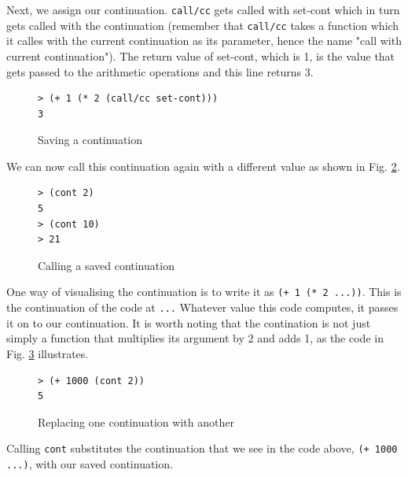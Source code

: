 \documentclass[11pt]{report}
\begin{document}
Next, we assign our continuation. \texttt{call/cc} gets called with set-cont which in turn gets called with the continuation (remember that \texttt{call/cc} takes a function which it calles with the current continuation as its parameter, hence the name "call with current continuation"). The return value of set-cont, which is 1, is the value that gets passed to the arithmetic operations and this line returns 3.
\begin{figure}[ht]
\begin{lstlisting}
> (+ 1 (* 2 (call/cc set-cont)))
3
\end{lstlisting}
\caption{Saving a continuation}
\label{contcc2}
\end{figure}

We can now call this continuation again with a different value as shown in Fig. \ref{contcc3}.
\begin{figure}[ht]
\begin{lstlisting}
> (cont 2)
5
> (cont 10)
> 21
\end{lstlisting}
\caption{Calling a saved continuation}
\label{contcc3}
\end{figure}

One way of visualising the continuation is to write it as \texttt{(+ 1 (* 2 ...))}. This is the continuation of the code at \texttt{...} Whatever value this code computes, it passes it on to our continuation. It is worth noting that the contination is not just simply a function that multiplies its argument by 2 and adds 1, as the code in Fig. \ref{contcc4} illustrates.
\begin{figure}[ht]
\begin{lstlisting}
> (+ 1000 (cont 2))
5
\end{lstlisting}
\caption{Replacing one continuation with another}
\label{contcc4}
\end{figure}

Calling \texttt{cont} substitutes the continuation that we see in the code above, \texttt{(+ 1000 ...)}, with our saved continuation.
\end{document}
